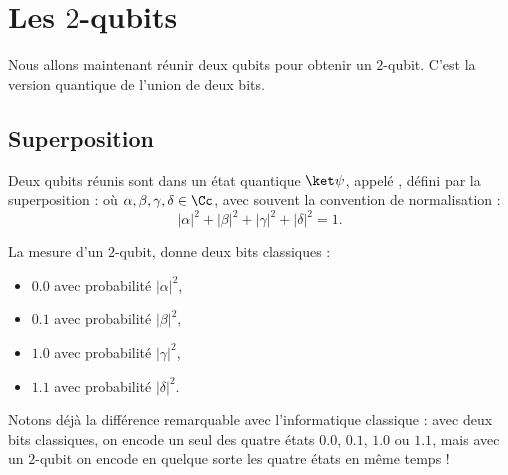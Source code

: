 \documentclass[11pt,class=report,crop=false]{standalone}
\begin{document}
\section{Les $2$-qubits}


Nous allons maintenant réunir deux qubits pour obtenir un $2$-qubit. C'est la version  quantique de l'union de deux bits.

\subsection{Superposition}


Deux qubits réunis sont dans un état quantique $\ket\psi$, appelé , défini par la superposition :
où $\alpha,\beta,\gamma,\delta \in \Cc$, avec souvent la convention de normalisation :
$$|\alpha|^2+|\beta|^2+|\gamma|^2+|\delta|^2=1.$$

La mesure d'un $2$-qubit, donne deux bits classiques :
\begin{itemize}
  \item $0.0$ avec probabilité $|\alpha|^2$,
  \item $0.1$ avec probabilité $|\beta|^2$,
  \item $1.0$ avec probabilité $|\gamma|^2$,
  \item $1.1$ avec probabilité $|\delta|^2$.      
\end{itemize}

Notons déjà la différence remarquable avec l'informatique classique : avec deux bits classiques, on encode un seul des quatre états $0.0$, $0.1$, $1.0$ ou $1.1$, mais avec 
un $2$-qubit on encode en quelque sorte les quatre états en même temps !
\end{document}

